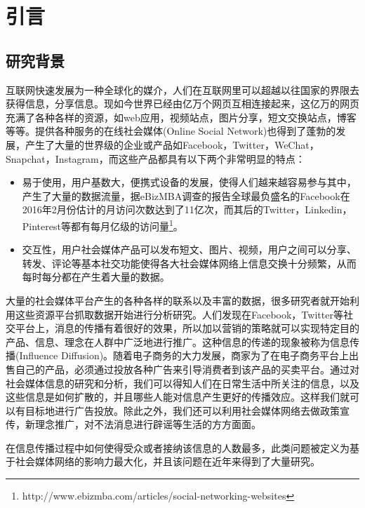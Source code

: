 

\chapter{引言}
\label{cha:firstChap01}
\section{研究背景}
互联网快速发展为一种全球化的媒介，人们在互联网里可以超越以往国家的界限去获得信息，分享信息。现如今世界已经由亿万个网页互相连接起来，这亿万的网页充满了各种各样的资源，如web应用，视频站点，图片分享，短文交换站点，博客等等。提供各种服务的在线社会媒体(Online Social Network)也得到了蓬勃的发展，产生了大量的世界级的企业或产品如Facebook，Twitter，WeChat，Snapchat，Instagram，而这些产品都具有以下两个非常明显的特点：
\begin{itemize}
\item 易于使用，用户基数大，便携式设备的发展，使得人们越来越容易参与其中，产生了大量的数据流量，据eBizMBA调查的报告全球最负盛名的Facebook在2016年2月份估计的月访问次数达到了11亿次，而其后的Twitter，Linkedin，Pinterest等都有每月亿级的访问量\footnote{http://www.ebizmba.com/articles/social-networking-websites}。
\item 交互性，用户社会媒体产品可以发布短文、图片、视频，用户之间可以分享、转发、评论等基本社交功能使得各大社会媒体网络上信息交换十分频繁，从而每时每分都在产生着大量的数据。
\end{itemize}


大量的社会媒体平台产生的各种各样的联系以及丰富的数据，很多研究者就开始利用这些资源平台抓取数据开始进行分析研究。人们发现在Facebook，Twitter等社交平台上，消息的传播有着很好的效果，所以加以营销的策略就可以实现特定目的产品、信息、理念在人群中广泛地进行推广\cite{he2012influence}。这种信息的传递的现象被称为信息传播(Influence Diffusion)。随着电子商务的大力发展，商家为了在电子商务平台上出售自己的产品，必须通过投放各种广告来引导消费者到该产品的买卖平台。通过对社会媒体信息的研究和分析，我们可以得知人们在日常生活中所关注的信息，以及这些信息是如何扩散的，并且哪些人能对信息产生更好的传播效应。这样我们就可以有目标地进行广告投放。除此之外，我们还可以利用社会媒体网络去做政策宣传，新理念推广，对不法消息进行辟谣等生活的方方面面。


在信息传播过程中如何使得受众或者接纳该信息的人数最多，此类问题被定义为基于社会媒体网络的影响力最大化，并且该问题在近年来得到了大量研究\cite{he2012influence}\cite{kempe2003maximizing}\cite{chen2011influence}\cite{chen2010scalableKDD}。


